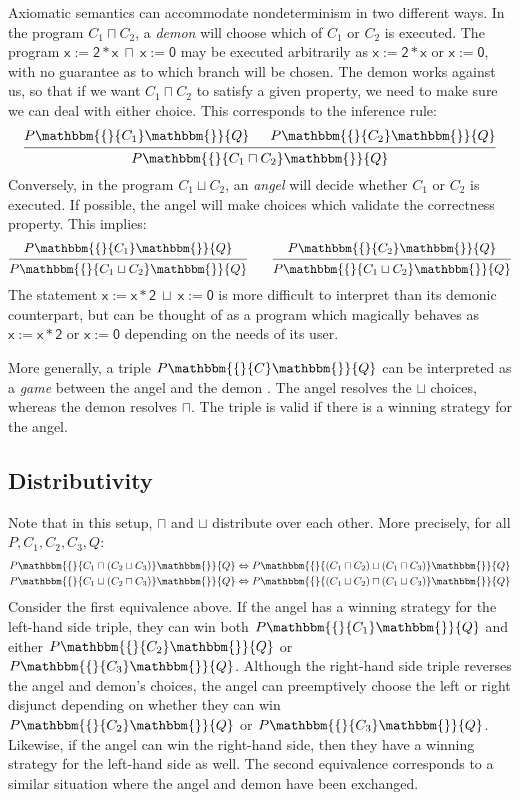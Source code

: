 \documentclass[draft,11pt]{report}
\newcommand{\kw}[1]{\ensuremath{ \mathsf{#1} }}
\newcommand{\htr}[3]{{ {#1} \mathbbm{\{} {#2} \mathbbm{\}} {#3} }}
\begin{document}
Axiomatic semantics
can accommodate nondeterminism in two different ways.
In the program $C_1 \sqcap C_2$,
a \emph{demon} will choose which of $C_1$ or $C_2$ is executed.
The program $\kw{x := 2 * x} \: \sqcap \: \kw{x := 0}$
may be executed arbitrarily as $\kw{x := 2 * x}$ or $\kw{x := 0}$,
with no guarantee as to which branch will be chosen.
The demon works against us,
so that if we want $C_1 \sqcap C_2$ to satisfy a given property,
we need to make sure we can deal with either choice.
This corresponds to the inference rule:
\[
  \begin{prooftree}
    \hypo{\htr{P}{C_1}{Q}}
    \hypo{\htr{P}{C_2}{Q}}
    \infer2{\htr{P}{C_1 \sqcap C_2}{Q}}
  \end{prooftree}
\]
Conversely,
in the program $C_1 \sqcup C_2$,
an \emph{angel} will decide whether $C_1$ or $C_2$ is executed.
If possible,
the angel will make choices which validate
the correctness property.
This implies:
\[
  \begin{prooftree}
    \hypo{\htr{P}{C_1}{Q}}
    \infer1{\htr{P}{C_1 \sqcup C_2}{Q}}
  \end{prooftree}
  \qquad
  \begin{prooftree}
    \hypo{\htr{P}{C_2}{Q}}
    \infer1{\htr{P}{C_1 \sqcup C_2}{Q}}
  \end{prooftree}
\]
The statement $\kw{x := x * 2} \: \sqcup \: \kw{x := 0}$
is more difficult to interpret than its demonic counterpart,
but can be thought of as a program which magically behaves as
$\kw{x := x * 2}$ or $\kw{x := 0}$
depending on the needs of its user.

More generally,
a triple $\htr{P}{C}{Q}$
can be interpreted as a \emph{game}
between the angel and the demon \citep{refcal}.
The angel resolves the $\sqcup$ choices,
whereas the demon resolves $\sqcap$.
The triple is valid if there is a winning strategy
for the angel.


\subsection{Distributivity} %

Note that in this setup,
$\sqcap$ and $\sqcup$ distribute over each other.
More precisely, for all $P, C_1, C_2, C_3, Q$:
\begin{align*}
  \htr{P}{C_1 \sqcap (C_2 \sqcup C_3)}{Q} &\Leftrightarrow
    \htr{P}{(C_1 \sqcap C_2) \sqcup (C_1 \sqcap C_3)}{Q} \\
  \htr{P}{C_1 \sqcup (C_2 \sqcap C_3)}{Q} &\Leftrightarrow
    \htr{P}{(C_1 \sqcup C_2) \sqcap (C_1 \sqcup C_3)}{Q}
\end{align*}
Consider the first equivalence above.
If the angel has a winning strategy for
the left-hand side triple,
they can win both $\htr{P}{C_1}{Q}$
and either $\htr{P}{C_2}{Q}$ or $\htr{P}{C_3}{Q}$.
Although the right-hand side triple
reverses the angel and demon's choices,
the angel can preemptively choose the left or right
disjunct depending on whether they can win
$\htr{P}{C_2}{Q}$ or $\htr{P}{C_3}{Q}$.
Likewise, if the angel can win the right-hand side,
then they have a winning strategy for the left-hand side as well.
The second equivalence corresponds to a similar situation
where the angel and demon have been exchanged.
\end{document}
